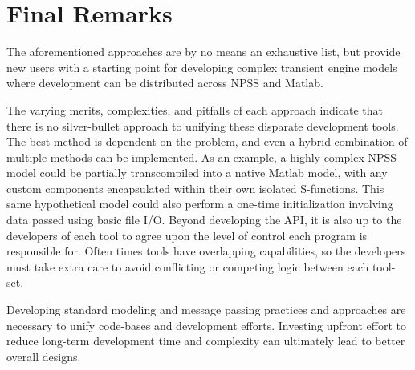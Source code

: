 \documentclass[heading.tex]{subfiles}
\begin{document}
\section{Final Remarks}

The aforementioned approaches are by no means an exhaustive list,
but provide new users with a starting point for developing complex transient engine models
where development can be distributed across NPSS and Matlab.

The varying merits, complexities, and pitfalls of each approach indicate that there is
no silver-bullet approach to unifying these disparate development tools.
The best method is dependent on the problem,
and even a hybrid combination of multiple methods can be implemented.
As an example, a highly complex NPSS model could be partially
transcompiled into a native Matlab model,
with any custom components encapsulated within their own isolated S-functions.
This same hypothetical model could also perform a one-time initialization
involving data passed using basic file I/O.
Beyond developing the API, it is also up to the developers of each tool to
agree upon the level of control each program is responsible for.
Often times tools have overlapping capabilities,
so the developers must take extra care to
avoid conflicting or competing logic between each tool-set.

Developing standard modeling and message passing practices and approaches
are necessary to unify code-bases and development efforts.
Investing upfront effort to reduce long-term development time and complexity
can ultimately lead to better overall designs.
\end{document}
